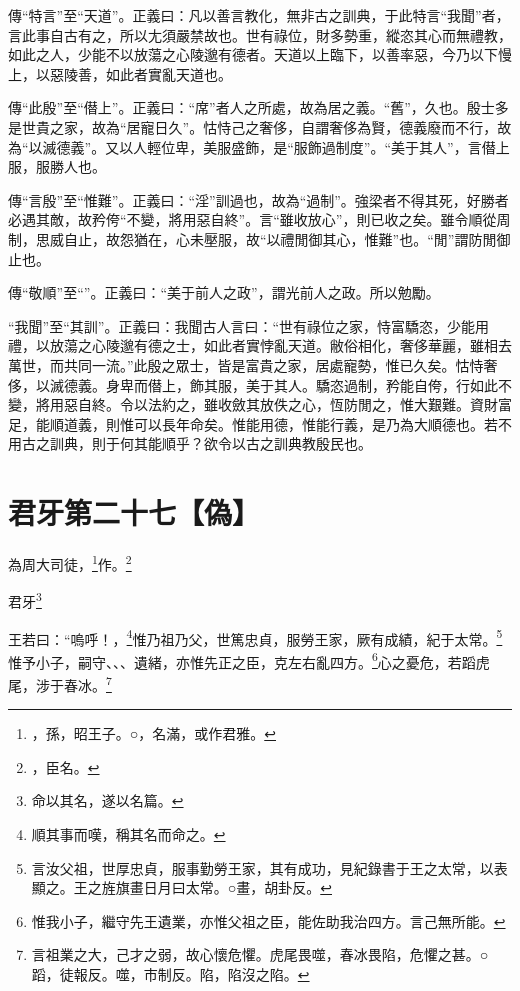 {\noindent\zhuan{}\fzbyks 傳“特言”至“天道”。正義曰：凡以善言教化，無非古之訓典，于此特言“我聞”者，言此事自古有之，所以尢須嚴禁故也。世有祿位，財多勢重，縱恣其心而無禮教，如此之人，少能不以放蕩之心陵邈有德者。天道以上臨下，以善率惡，今乃以下慢上，以惡陵善，如此者實亂天道也。 \par}

{\noindent\zhuan{}\fzbyks 傳“此殷”至“僣上”。正義曰：“席”者人之所處，故為居之義。“舊”，久也。殷士多是世貴之家，故為“居寵日久”。怙恃己之奢侈，自謂奢侈為賢，德義廢而不行，故為“以滅德義”。又以人輕位卑，美服盛飾，是“服飾過制度”。“美于其人”，言僣上服，服勝人也。 \par}

{\noindent\zhuan{}\fzbyks 傳“言殷”至“惟難”。正義曰：“淫”訓過也，故為“過制”。強梁者不得其死，好勝者必遇其敵，故矜侉“不變，將用惡自終”。言“雖收放心”，則已收之矣。雖令順從周制，思威自止，故怨猶在，心未壓服，故“以禮閒御其心，惟難”也。“閒”謂防閒御止也。 \par}

{\noindent\zhuan{}\fzbyks 傳“敬順”至“”。正義曰：“美于前人之政”，謂光前人之政。所以勉勵。 \par}

{\noindent\shu{}\fzkt “我聞”至“其訓”。正義曰：我聞古人言曰：“世有祿位之家，恃富驕恣，少能用禮，以放蕩之心陵邈有德之士，如此者實悖亂天道。敝俗相化，奢侈華麗，雖相去萬世，而共同一流。”此殷之眾士，皆是富貴之家，居處寵勢，惟已久矣。怙恃奢侈，以滅德義。身卑而僣上，飾其服，美于其人。驕恣過制，矜能自侉，行如此不變，將用惡自終。令以法約之，雖收斂其放佚之心，恆防閒之，惟大艱難。資財富足，能順道義，則惟可以長年命矣。惟能用德，惟能行義，是乃為大順德也。若不用古之訓典，則于何其能順乎？欲令以古之訓典教殷民也。 \par}

\section{君牙第二十七【偽】}


為周大司徒，\footnote{，孫，昭王子。○，名滿，或作君雅。}作。\footnote{，臣名。}

君牙\footnote{命以其名，遂以名篇。}

王若曰：“嗚呼！，\footnote{順其事而嘆，稱其名而命之。}惟乃祖乃父，世篤忠貞，服勞王家，厥有成績，紀于太常。\footnote{言汝父祖，世厚忠貞，服事勤勞王家，其有成功，見紀錄書于王之太常，以表顯之。王之旌旗畫日月曰太常。○畫，胡卦反。}惟予小子，嗣守、、、遺緒，亦惟先正之臣，克左右亂四方。\footnote{惟我小子，繼守先王遺業，亦惟父祖之臣，能佐助我治四方。言己無所能。}心之憂危，若蹈虎尾，涉于春冰。\footnote{言祖業之大，己才之弱，故心懷危懼。虎尾畏噬，春冰畏陷，危懼之甚。○蹈，徒報反。噬，市制反。陷，陷沒之陷。}


